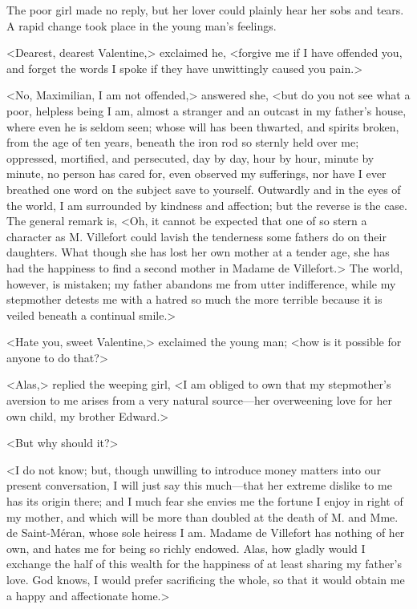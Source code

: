  The poor girl made no reply, but her lover could plainly hear her sobs and tears. A rapid change took place in the young man's feelings. 

 <Dearest, dearest Valentine,> exclaimed he, <forgive me if I have offended you, and forget the words I spoke if they have unwittingly caused you pain.> 

 <No, Maximilian, I am not offended,> answered she, <but do you not see what a poor, helpless being I am, almost a stranger and an outcast in my father's house, where even he is seldom seen; whose will has been thwarted, and spirits broken, from the age of ten years, beneath the iron rod so sternly held over me; oppressed, mortified, and persecuted, day by day, hour by hour, minute by minute, no person has cared for, even observed my sufferings, nor have I ever breathed one word on the subject save to yourself. Outwardly and in the eyes of the world, I am surrounded by kindness and affection; but the reverse is the case. The general remark is, <Oh, it cannot be expected that one of so stern a character as M. Villefort could lavish the tenderness some fathers do on their daughters. What though she has lost her own mother at a tender age, she has had the happiness to find a second mother in Madame de Villefort.> The world, however, is mistaken; my father abandons me from utter indifference, while my stepmother detests me with a hatred so much the more terrible because it is veiled beneath a continual smile.> 

 <Hate you, sweet Valentine,> exclaimed the young man; <how is it possible for anyone to do that?> 

 <Alas,> replied the weeping girl, <I am obliged to own that my stepmother's aversion to me arises from a very natural source—her overweening love for her own child, my brother Edward.> 

 <But why should it?> 

 <I do not know; but, though unwilling to introduce money matters into our present conversation, I will just say this much—that her extreme dislike to me has its origin there; and I much fear she envies me the fortune I enjoy in right of my mother, and which will be more than doubled at the death of M. and Mme. de Saint-Méran, whose sole heiress I am. Madame de Villefort has nothing of her own, and hates me for being so richly endowed. Alas, how gladly would I exchange the half of this wealth for the happiness of at least sharing my father's love. God knows, I would prefer sacrificing the whole, so that it would obtain me a happy and affectionate home.> 

